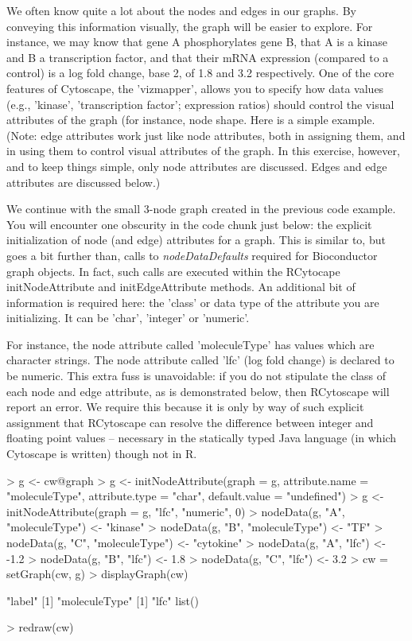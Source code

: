 \documentclass[12pt]{article}
\begin{document}
We often know quite a lot about the nodes and edges in our graphs.   By conveying this information visually, the graph will be
easier to explore.  For instance, we may know that gene A phosphorylates gene B, that A is a kinase and B a
transcription factor, and that their mRNA expression (compared to a control) is a log fold change, base 2, of 1.8 and
3.2 respectively.  One of the core features of Cytoscape, the 'vizmapper', allows you to specify how data values (e.g.,
'kinase', 'transcription factor'; expression ratios) should control the visual attributes of the graph (for instance,
node shape.  Here is a simple example.  (Note: edge attributes work just like node attributes, both in assigning them,
and in using them to control visual attributes of the graph.  In this exercise, however, and to keep things simple, only
node attributes are discussed.  Edges and edge attributes are discussed below.)

We continue with the small 3-node graph created in the previous code example.  You will encounter one obscurity in the code chunk
just below: the explicit initialization of node (and edge) attributes for a graph.  This is similar to, but goes a bit further than, calls to 
\emph{nodeDataDefaults} required for Bioconductor graph objects.  In fact, such calls are executed within the RCytocape initNodeAttribute and initEdgeAttribute methods.  An additional bit of information is required here: the 'class' or data type of the attribute you are initializing.  It can be 'char', 'integer' or 'numeric'.  

For instance, the node attribute called 'moleculeType' has values which are character strings.  The node attribute called 'lfc' (log fold change) is declared to be numeric.  This extra fuss is unavoidable: if you do not stipulate the class of each node and edge attribute, as is demonstrated below, then
RCytoscape will report an error.  We require this because it is only by way of such explicit assignment that RCytoscape can resolve the
difference between integer and floating point values -- necessary in the statically typed Java language (in which
Cytoscape is written) though not in R.  

\begin{Schunk}
\begin{Sinput}
> g <- cw@graph
> g <- initNodeAttribute(graph = g, attribute.name = "moleculeType", attribute.type = "char", default.value = "undefined")
> g <- initNodeAttribute(graph = g, "lfc", "numeric", 0)
> nodeData(g, "A", "moleculeType") <- "kinase"
> nodeData(g, "B", "moleculeType") <- "TF"
> nodeData(g, "C", "moleculeType") <- "cytokine"
> nodeData(g, "A", "lfc") <- -1.2
> nodeData(g, "B", "lfc") <- 1.8
> nodeData(g, "C", "lfc") <- 3.2
> cw = setGraph(cw, g)
> displayGraph(cw)
\end{Sinput}
\begin{Soutput}
[1] "label"
[1] "moleculeType"
[1] "lfc"
list()
\end{Soutput}
\begin{Sinput}
> redraw(cw)
\end{Sinput}
\end{Schunk}
\end{document}
